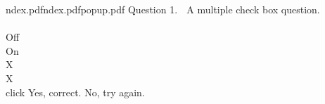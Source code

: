 \documentclass[dvips]{article}
\begin{document}
{ndex.pdf}{ndex.pdf}{popup.pdf} %
{Question 1. $\;$ A multiple check box question. \\ \\ %
    \noindent
    \checkone  Off  \\
    \checktwo On  \\
     X   \\
    \checkfour  X  \\
     click 
} %
{Yes, correct.} %
{No, try again.} %
\end{document}
